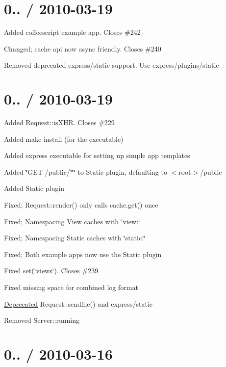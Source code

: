 \section*{0.. / 2010-\/03-\/19 }


\begin{DoxyItemize}
\item Added coffeescript example app. Closes \#242
\item Changed; cache api now async friendly. Closes \#240
\item Removed deprecated \textquotesingle{}express/static\textquotesingle{} support. Use \textquotesingle{}express/plugins/static\textquotesingle{}
\end{DoxyItemize}

\section*{0.. / 2010-\/03-\/19 }


\begin{DoxyItemize}
\item Added Request\+::is\+X\+H\+R. Closes \#229
\item Added {\ttfamily make install} (for the executable)
\item Added {\ttfamily express} executable for setting up simple app templates
\item Added \char`\"{}\+G\+E\+T /public/$\ast$\char`\"{} to Static plugin, defaulting to $<$root$>$/public
\item Added Static plugin
\item Fixed; Request\+::render() only calls cache.\+get() once
\item Fixed; Namespacing View caches with \char`\"{}view\+:\char`\"{}
\item Fixed; Namespacing Static caches with \char`\"{}static\+:\char`\"{}
\item Fixed; Both example apps now use the Static plugin
\item Fixed set(\char`\"{}views\char`\"{}). Closes \#239
\item Fixed missing space for combined log format
\item \hyperlink{class_deprecated}{Deprecated} Request\+::sendfile() and \textquotesingle{}express/static\textquotesingle{}
\item Removed Server\+::running
\end{DoxyItemize}

\section*{0.. / 2010-\/03-\/16 }



